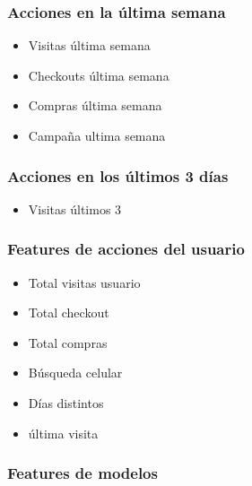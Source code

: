 \documentclass[a4paper ,12pt]{article}
\begin{document}
		\subsubsection{Acciones en la última semana}
			
			\begin{itemize}
				\item  Visitas última semana
				\item  Checkouts última semana
				\item  Compras última semana 
				\item Campaña ultima semana
			\end{itemize}
			

		\subsubsection{Acciones en los últimos 3 días}
		
		
		
			\begin{itemize}
				\item Visitas últimos 3
			\end{itemize}





\subsubsection{Features de acciones del usuario}

	\begin{itemize}
		\item Total visitas usuario
		
		\item Total checkout
		
		\item Total compras
		
		\item Búsqueda celular 
		
		\item Días distintos 
		
		\item última visita 
		
	\end{itemize}
	


\subsubsection{Features de modelos}
\end{document}
